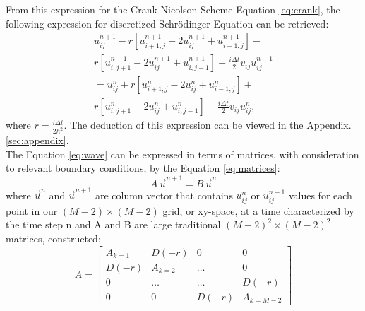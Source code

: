 \documentclass[10pt, nofootinbib, twocolumn]{revtex4-1}
\begin{document}
From this expression for the Crank-Nicolson Scheme Equation \eqref{eq:crank}, the following expression for discretized Schrödinger Equation can be retrieved: 
\begin{equation}\label{eq:wave}
    \begin{split}
        u_{ij}^{n+1}  -  r \left[u_{i+1,j}^{n+1} - 2u_{ij}^{n+1} + u_{i-1,j}^{n+1}\right]  - \\
        r \left[u_{i,j+1}^{n+1} - 2u_{ij}^{n+1} + u_{i,j-1}^{n+1}\right]  +  \frac{i \Delta t}{2} v_{ij} u_{ij}^{n+1} \\
        = u_{ij}^n  +  r \left[u_{i+1,j}^n - 2u_{ij}^n + u_{i-1,j}^n\right]  +  \\ 
        r \left[u_{i,j+1}^n - 2u_{ij}^n + u_{i,j-1}^n\right]  -  \frac{i \Delta t}{2} v_{ij} u_{ij}^n,
    \end{split}
\end{equation}
where $r = \frac{i \Delta t}{2 h^2}$. The deduction of this expression can be viewed in the Appendix. \ref{sec:appendix}. \\
The Equation \eqref{eq:wave} can be expressed in terms of matrices, with consideration to relevant boundary conditions, by the Equation \eqref{eq:matrices}:
\begin{equation}\label{eq:matrices}
    A \,\vec{u}^{n+1} = B \,\vec{u}^{n}
\end{equation}
where $\vec{u}^n$ and  $\vec{u}^{n+1}$ are column vector that contains $u^n_{ij}$ or $u^{n+1}_{ij}$ values for each point in our $(M-2)\times (M-2)$ grid, or xy-space, at a time characterized by the time step n and A and B are large traditional $(M-2)^2\times (M-2)^2$  matrices, constructed:
\[
A = 
\begin{bmatrix}
    A_{k=1} & D(-r) & 0 & 0 \\
    D(-r) & A_{k=2} & \ldots & 0 \\
    0 & \ldots & \ldots & D(-r) \\
    0 & 0 & D(-r) & A_{k=M-2}
\end{bmatrix}
\]
\end{document}
